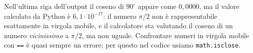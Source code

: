 \begin{attenzione}
Nell'ultima riga dell'output il coseno di $90^{\circ}$ appare come $0{,}0000$, ma il
valore calcolato da Python è $6{,}1\cdot10^{-17}$: il numero $\pi/2$ non è
rappresentabile esattamente in virgola mobile, e il calcolatore sta valutando il coseno
di un numero \emph{vicinissimo} a $\pi/2$, ma non uguale. Confrontare numeri in virgola
mobile con \texttt{==} è quasi sempre un errore; per questo nel codice usiamo
\texttt{math.isclose}.
\end{attenzione}
